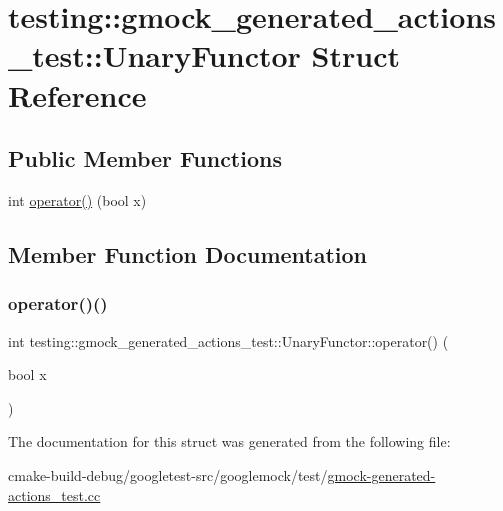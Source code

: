 \hypertarget{structtesting_1_1gmock__generated__actions__test_1_1UnaryFunctor}{}\section{testing\+::gmock\+\_\+generated\+\_\+actions\+\_\+test\+::Unary\+Functor Struct Reference}
\label{structtesting_1_1gmock__generated__actions__test_1_1UnaryFunctor}
\subsection*{Public Member Functions}
\begin{DoxyCompactItemize}
\item 
int \mbox{\hyperlink{structtesting_1_1gmock__generated__actions__test_1_1UnaryFunctor_aeae4c0025faeac92845d652b35ac2846}{operator()}} (bool x)
\end{DoxyCompactItemize}


\subsection{Member Function Documentation}
\mbox{\label{structtesting_1_1gmock__generated__actions__test_1_1UnaryFunctor_aeae4c0025faeac92845d652b35ac2846}} 
\subsubsection{\texorpdfstring{operator()()}{operator()()}}
{\footnotesize\ttfamily int testing\+::gmock\+\_\+generated\+\_\+actions\+\_\+test\+::\+Unary\+Functor\+::operator() (\begin{DoxyParamCaption}\item[{bool}]{x }\end{DoxyParamCaption})\hspace{0.3cm}{\ttfamily [inline]}}



The documentation for this struct was generated from the following file\+:\begin{DoxyCompactItemize}
\item 
cmake-\/build-\/debug/googletest-\/src/googlemock/test/\mbox{\hyperlink{gmock-generated-actions__test_8cc}{gmock-\/generated-\/actions\+\_\+test.\+cc}}\end{DoxyCompactItemize}
